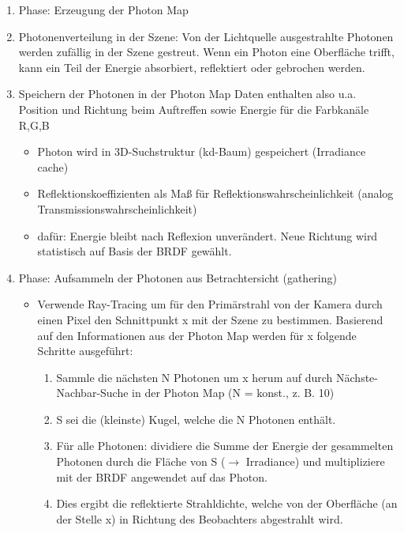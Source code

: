 \documentclass[10pt,landscape]{article}
\begin{document}
\begin{multicols}{3}
\begin{enumerate}
  \item Phase: Erzeugung der Photon Map
  \item Photonenverteilung in der Szene: Von der Lichtquelle ausgestrahlte Photonen werden zufällig in der Szene gestreut. Wenn ein Photon eine Oberfläche trifft, kann ein Teil der Energie absorbiert, reflektiert oder gebrochen werden.
  \item Speichern der Photonen in der Photon Map Daten enthalten also u.a. Position und Richtung beim Auftreffen sowie Energie für die Farbkanäle R,G,B
        \begin{itemize}
          \item Photon wird in 3D-Suchstruktur (kd-Baum) gespeichert (Irradiance cache)
          \item Reflektionskoeffizienten als Maß für Reflektionswahrscheinlichkeit (analog Transmissionswahrscheinlichkeit)
          \item dafür: Energie bleibt nach Reflexion unverändert. Neue Richtung wird statistisch auf Basis der BRDF gewählt.
        \end{itemize}
  \item  Phase: Aufsammeln der Photonen aus Betrachtersicht (gathering)
        \begin{itemize}
          \item Verwende Ray-Tracing um für den Primärstrahl von der Kamera durch einen Pixel den Schnittpunkt x mit der Szene zu bestimmen. Basierend auf den Informationen aus der Photon Map werden für x folgende Schritte ausgeführt:
                \begin{enumerate}
                  \item Sammle die nächsten N Photonen um x herum auf durch Nächste-Nachbar-Suche in der Photon Map (N = konst., z. B. 10)
                  \item S sei die (kleinste) Kugel, welche die N Photonen enthält.
                  \item Für alle Photonen: dividiere die Summe der Energie der gesammelten Photonen durch die Fläche von S ($\rightarrow$ Irradiance) und multipliziere mit der  BRDF angewendet auf das Photon.
                  \item Dies ergibt die reflektierte Strahldichte, welche von der Oberfläche (an der Stelle x) in Richtung des Beobachters abgestrahlt wird.
                \end{enumerate}
        \end{itemize}
\end{enumerate}


\end{multicols}
\end{document}
